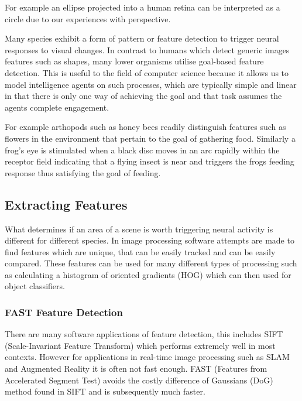 \documentclass{mproj}
\begin{document}
For example an ellipse projected into a human retina can be interpreted as a circle due to our experiences with perspective. 

Many species exhibit a form of pattern or feature detection to trigger neural responses to visual changes. In contrast to humans which detect generic images features such as shapes, many lower organisms utilise goal-based feature detection. This is useful to the field of computer science because it allows us to model intelligence agents on such processes, which are typically simple and linear in that there is only one way of achieving the goal and that task assumes the agents complete engagement.

For example arthopods such as honey bees readily distinguish features such as flowers in the environment that pertain to the goal of gathering food. Similarly a frog's eye is stimulated when a black disc moves in an arc rapidly within the receptor field indicating that a flying insect is near and triggers the frogs feeding response \cite{} thus satisfying the goal of feeding.

\subsection{Extracting Features}

What determines if an area of a scene is worth triggering neural activity is different for different species. In image processing software attempts are made to find features which are unique, that can be easily tracked and can be easily compared. These features can be used for many different types of processing such as calculating a histogram of oriented gradients (HOG) which can then used for object classifiers.

\subsubsection{FAST Feature Detection}

There are many software applications of feature detection, this includes SIFT (Scale-Invariant Feature Transform) which performs extremely well in most contexts\cite{Mikolajczyk}. However for applications in real-time image processing such as SLAM and Augmented Reality it is often not fast enough. FAST (Features from Accelerated Segment Test) \cite{rosten_2006_machine}\cite{rosten_2005_annotations} avoids the costly difference of Gaussians (DoG) method found in SIFT and is subsequently much faster.
\end{document}
